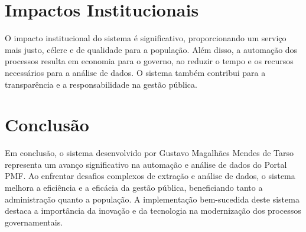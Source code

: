 \documentclass[11pt]{article}
\begin{document}
\section{Impactos Institucionais}
\label{sec:orgc7423ce}

O impacto institucional do sistema é significativo, proporcionando um serviço mais justo, célere e de qualidade para a população. Além disso, a automação dos processos resulta em economia para o governo, ao reduzir o tempo e os recursos necessários para a análise de dados. O sistema também contribui para a transparência e a responsabilidade na gestão pública.

\section{Conclusão}
\label{sec:org73020e0}

Em conclusão, o sistema desenvolvido por Gustavo Magalhães Mendes de Tarso representa um avanço significativo na automação e análise de dados do Portal PMF. Ao enfrentar desafios complexos de extração e análise de dados, o sistema melhora a eficiência e a eficácia da gestão pública, beneficiando tanto a administração quanto a população. A implementação bem-sucedida deste sistema destaca a importância da inovação e da tecnologia na modernização dos processos governamentais.
\end{document}
